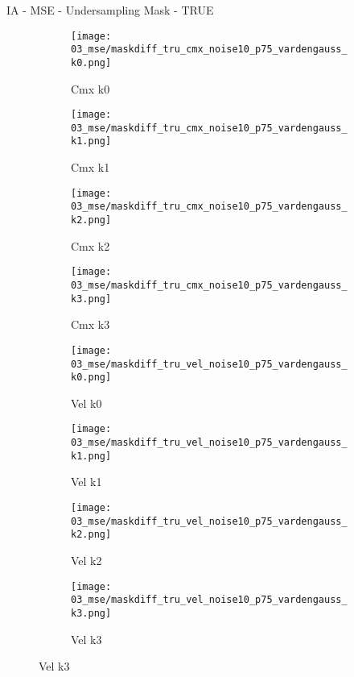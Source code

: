\documentclass{beamer}
\begin{document}
\begin{frame}{IA - MSE - Undersampling Mask - TRUE}{}
\begin{figure}
\begin{subfigure}{0.24\textwidth}
\texttt{[image: 03\_mse/maskdiff\_tru\_cmx\_noise10\_p75\_vardengauss\_k0.png]}
\vspace{-20pt}
\caption*{\tiny Cmx k0}
\end{subfigure}
\begin{subfigure}{0.24\textwidth}
\texttt{[image: 03\_mse/maskdiff\_tru\_cmx\_noise10\_p75\_vardengauss\_k1.png]}
\vspace{-20pt}
\caption*{\tiny Cmx k1}
\end{subfigure}
\begin{subfigure}{0.24\textwidth}
\texttt{[image: 03\_mse/maskdiff\_tru\_cmx\_noise10\_p75\_vardengauss\_k2.png]}
\vspace{-20pt}
\caption*{\tiny Cmx k2}
\end{subfigure}
\begin{subfigure}{0.24\textwidth}
\texttt{[image: 03\_mse/maskdiff\_tru\_cmx\_noise10\_p75\_vardengauss\_k3.png]}
\vspace{-20pt}
\caption*{\tiny Cmx k3}
\end{subfigure}

\begin{subfigure}{0.24\textwidth}
\texttt{[image: 03\_mse/maskdiff\_tru\_vel\_noise10\_p75\_vardengauss\_k0.png]}
\vspace{-20pt}
\caption*{\tiny Vel k0}
\end{subfigure}
\begin{subfigure}{0.24\textwidth}
\texttt{[image: 03\_mse/maskdiff\_tru\_vel\_noise10\_p75\_vardengauss\_k1.png]}
\vspace{-20pt}
\caption*{\tiny Vel k1}
\end{subfigure}
\begin{subfigure}{0.24\textwidth}
\texttt{[image: 03\_mse/maskdiff\_tru\_vel\_noise10\_p75\_vardengauss\_k2.png]}
\vspace{-20pt}
\caption*{\tiny Vel k2}
\end{subfigure}
\begin{subfigure}{0.24\textwidth}
\texttt{[image: 03\_mse/maskdiff\_tru\_vel\_noise10\_p75\_vardengauss\_k3.png]}
\vspace{-20pt}
\caption*{\tiny Vel k3}
\end{subfigure}
\end{figure}
\end{frame}
\end{document}
